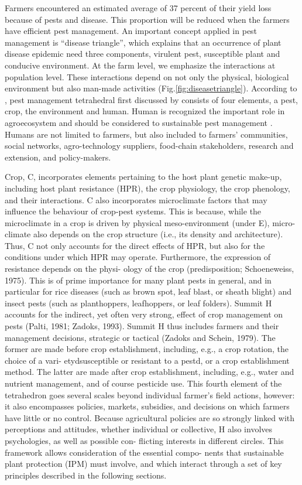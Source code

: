 Farmers encountered an estimated average of 37 percent of their yield loss because of pests and disease. This proportion will be reduced when the farmers have efficient pest management. An important concept applied in pest management is ``disease triangle'', which explains that an occurrence of plant disease epidemic need three components, virulent pest, susceptible plant and conducive environment. At the farm level, we emphasize the interactions at population level. These interactions depend on not only the physical, biological environment but also man-made activities (Fig.\ref{fig:diseasetriangle}). According to \citet{Savary_2006_Quantification}, pest management tetrahedral first discussed by \cite{Zadoks_1979_Epidem} consists of four elements, a pest, crop, the environment and human. Human is recognized the important role in agroecosystem and should be considered to sustainable pest management \citep{Zadok_1985_Crop}. Humans are not limited to farmers, but also included to farmers' communities, social networks, agro-technology suppliers, food-chain stakeholders, research and extension, and policy-makers. 


Crop, C, incorporates elements pertaining to the host plant genetic make-up, including host plant resistance (HPR), the crop physiology, the crop phenology, and their interactions. C also incorporates microclimate factors that may influence the behaviour of crop-pest systems. This is because, while the microclimate in a crop is driven by physical meso-environment (under E), micro- climate also depends on the crop structure (i.e., its density and architecture). Thus, C not only accounts for the direct effects of HPR, but also for the conditions under which HPR may operate. Furthermore, the expression of resistance depends on the physi- ology of the crop (predisposition; Schoeneweiss, 1975). This is of prime importance for many plant pests in general, and in particular for rice diseases (such as brown spot, leaf blast, or sheath blight) and insect pests (such as planthoppers, leafhoppers, or leaf folders).
Summit H accounts for the indirect, yet often very strong, effect of crop management on pests (Palti, 1981; Zadoks, 1993). Summit H thus includes farmers and their management decisions, strategic or tactical (Zadoks and Schein, 1979). The former are made before crop establishment, including, e.g., a crop rotation, the choice of a vari- etydsusceptible or resistant to a pestd, or a crop establishment method. The latter are made after crop establishment, including, e.g., water and nutrient management, and of course pesticide use. This fourth element of the tetrahedron goes several scales beyond individual farmer’s field actions, however: it also encompasses policies, markets, subsidies, and decisions on which farmers have little or no control. Because agricultural policies are so strongly linked with perceptions and attitudes, whether individual or collective, H also involves psychologies, as well as possible con- flicting interests in different circles.
This framework allows consideration of the essential compo- nents that sustainable plant protection (IPM) must involve, and which interact through a set of key principles described in the following sections.

